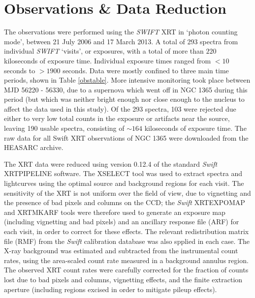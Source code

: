 \documentclass[useAMS,usenatbib]{sam}
\begin{document}
\section{Observations \& Data Reduction}

The observations were performed using the {\it SWIFT} XRT in `photon counting mode', between 21 July 2006 and 17 March 2013. A total of 293 spectra from individual {\it
SWIFT} `visits', or exposures, with a total of more than $220$ kiloseconds of exposure time. Individual exposure times ranged from $<10$ seconds to $>1900$ seconds.
Data were mostly confined to three main time periods, shown in Table \ref{obstable}. More intensive monitoring took place between MJD 56220 - 56330, due to a supernova
which went off in NGC 1365 during this period (but which was neither bright enough nor close enough to the nucleus to affect the data used in this study). Of the 293
spectra, 103 were rejected due either to very low total counts in the exposure or artifacts near the source, leaving 190 usable spectra, consisting of $\sim164$
kiloseconds of exposure time. The raw data for all Swift XRT observations of NGC 1365 were downloaded from the
HEASARC archive.

The XRT data were reduced using version 0.12.4 of the standard {\it Swift} XRTPIPELINE software. The XSELECT tool was used to extract spectra and lightcurves
using the optimal source and background regions for each visit. The sensitivity of the XRT is not uniform over the field of view, due to vignetting and the presence of
bad pixels and columns on the CCD; the {\it Swift} XRTEXPOMAP and XRTMKARF tools were therefore used to generate an exposure map (including vignetting and bad pixels) and
an ancillary response file (ARF) for each visit, in order to correct for these effects. The relevant redistribution matrix file (RMF) from the {\it Swift}
calibration database was also spplied in each case. The X-ray background was estimated and subtracted from the instrumental count rates, using the area-scaled count rate
measured in a background annulus region. The observed XRT count rates were carefully corrected for the fraction of counts lost due to bad pixels and columns, vignetting
effects, and the finite extraction aperture (including regions excised in order to mitigate pileup effects).
\end{document}
